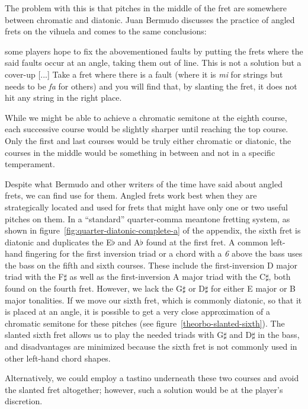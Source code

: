 The problem with this is that pitches in the middle of the fret are somewhere between
chromatic and diatonic.  Juan Bermudo discusses the practice of angled frets on the
vihuela and comes to the same conclusions:
\begin{blocks}
[...] some players hope to fix the abovementioned faults by putting the frets where the
said faults occur at an angle, taking them out of line. This is not a solution but a
cover-up [...] Take a fret where there is a fault (where it is \textit{mi} for strings
but needs to be \textit{fa} for others) and you will find that, by slanting the fret,
it does not hit any string in the right place. \autocite[112-113]{DE:1}
\end{blocks}
While we might be able to achieve a chromatic semitone at the eighth course, each
successive course would be slightly sharper until reaching the top course.  Only the
first and last courses would be truly either chromatic or diatonic, the courses in the
middle would be something in between and not in a specific temperament.

Despite what Bermudo and other writers of the time have said about angled frets, we can
find use for them.  Angled frets work best when they are strategically located and used
for frets that might have only one or two useful pitches on them. In a ``standard''
quarter-comma meantone fretting system, as shown in
figure~\ref{fig:quarter-diatonic-complete-a} of the appendix, the sixth fret is diatonic
and duplicates the E$\flat$ and A$\flat$ found at the first fret.  A common left-hand
fingering for the first inversion triad or a chord with a \textit{6} above the bass
uses the bass on the fifth and sixth courses. These include the first-inversion D major
triad with the F$\sharp$ as well as the first-inversion A major triad with the
C$\sharp$, both found on the fourth fret. However, we lack the G$\sharp$ or D$\sharp$
for either E major or B major tonalities. If we move our sixth fret, which is commonly
diatonic, so that it is placed at an angle, it is possible to get a very close
approximation of a chromatic semitone for these pitches (see
figure~\ref{theorbo-slanted-sixth}).  The slanted sixth fret allows us to play the
needed triads with G$\sharp$ and D$\sharp$ in the bass, and disadvantages are minimized
because the sixth fret is not commonly used in other left-hand chord shapes.

Alternatively, we could employ a tastino underneath these two courses and avoid the
slanted fret altogether; however, such a solution would be at the player's discretion.


